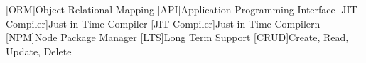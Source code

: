 [ORM]{Object-Relational Mapping}
[API]{Application Programming Interface}
[JIT-Compiler]{Just-in-Time-Compiler}
[JIT-Compiler]{Just-in-Time-Compilern}
[NPM]{Node Package Manager}
[LTS]{Long Term Support}
[CRUD]{Create, Read, Update, Delete}